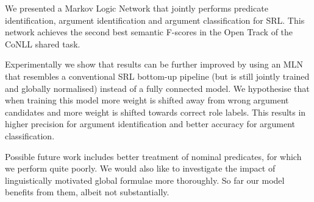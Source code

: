 

We presented a Markov Logic Network that jointly performs predicate identification, argument identification and argument classification for SRL. This network achieves the second best semantic F-scores in the Open Track of the CoNLL shared task. 

Experimentally we show that results can be further improved by using an MLN that resembles a conventional SRL bottom-up pipeline (but is still jointly trained and globally normalised) instead of a fully connected model. We hypothesise that when training this model more weight is shifted away from wrong argument candidates and more weight is shifted towards correct role labels. This results in higher precision for argument identification and better accuracy for argument classification. 

Possible future work includes better treatment of nominal predicates, for which we perform quite poorly. We would also like to investigate the impact of linguistically motivated global formulae more thoroughly. So far our model benefits from them, albeit not substantially. 

